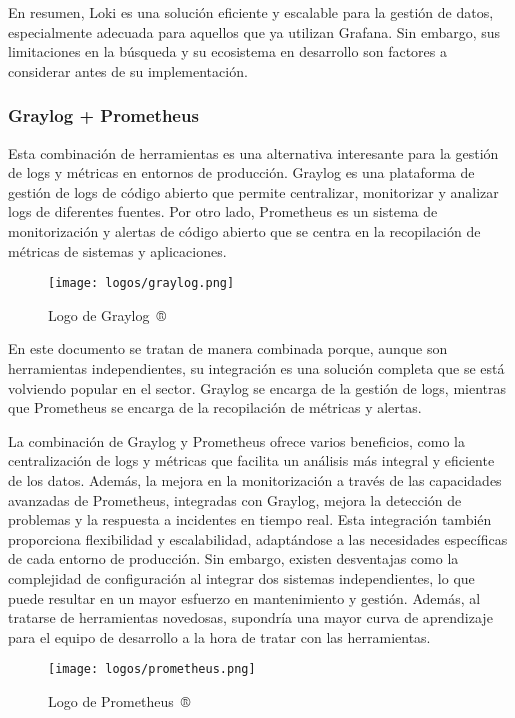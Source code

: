 En resumen, Loki es una solución eficiente y escalable para la gestión de datos,
especialmente adecuada para aquellos que ya utilizan Grafana. Sin embargo, sus
limitaciones en la búsqueda y su ecosistema en desarrollo son factores a
considerar antes de su implementación.


\subsubsection{Graylog + Prometheus}
Esta combinación de herramientas es una alternativa interesante para la gestión
de logs y métricas en entornos de producción. Graylog es una plataforma de
gestión de logs de código abierto que permite centralizar, monitorizar y
analizar logs de diferentes fuentes. Por otro lado, Prometheus es un sistema de
monitorización y alertas de código abierto que se centra en la recopilación de
métricas de sistemas y aplicaciones.

\begin{figure}[H]
	\centering
	\texttt{[image: logos/graylog.png]}
	\caption{Logo de Graylog~®}
\end{figure}

En este documento se tratan de manera combinada porque, aunque son herramientas
independientes, su integración es una solución completa que se está volviendo
popular en el sector. Graylog se encarga de la gestión de logs, mientras que
Prometheus se encarga de la recopilación de métricas y alertas.

La combinación de Graylog y Prometheus ofrece varios beneficios, como la
centralización de logs y métricas que facilita un análisis más integral y
eficiente de los datos. Además, la mejora en la monitorización a través de las
capacidades avanzadas de Prometheus, integradas con Graylog, mejora la detección
de problemas y la respuesta a incidentes en tiempo real. Esta integración
también proporciona flexibilidad y escalabilidad, adaptándose a las necesidades
específicas de cada entorno de producción. Sin embargo, existen desventajas como
la complejidad de configuración al integrar dos sistemas independientes, lo que
puede resultar en un mayor esfuerzo en mantenimiento y gestión. Además, al
tratarse de herramientas novedosas, supondría una mayor curva de aprendizaje
para el equipo de desarrollo a la hora de tratar con las herramientas.

\begin{figure}[H]
	\centering
	\texttt{[image: logos/prometheus.png]}
	\caption{Logo de Prometheus~®}
\end{figure}

